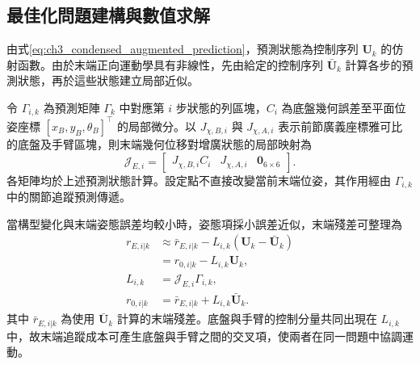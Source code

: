 \subsection{最佳化問題建構與數值求解}
\label{subsec:wholebody_qp_formulation}

由式\eqref{eq:ch3_condensed_augmented_prediction}，預測狀態為控制序列 $\mathbf{U}_k$ 的仿射函數。由於末端正向運動學具有非線性，先由給定的控制序列 $\bar{\mathbf{U}}_k$ 計算各步的預測狀態，再於這些狀態建立局部近似。

令 $\Gamma_{i,k}$ 為預測矩陣 $\Gamma_k$ 中對應第 $i$ 步狀態的列區塊，$C_i$ 為底盤幾何誤差至平面位姿座標 $[x_B,y_B,\theta_B]^{\top}$ 的局部微分。以 $J_{\chi,B,i}$ 與 $J_{\chi,A,i}$ 表示前節廣義座標雅可比的底盤及手臂區塊，則末端幾何位移對增廣狀態的局部映射為
\begin{equation}
    \mathcal{J}_{E,i}=
    \begin{bmatrix}
        J_{\chi,B,i}C_i & J_{\chi,A,i} & \mathbf{0}_{6\times6}
    \end{bmatrix}.
    \label{eq:ch3_tcp_augmented_geometric_jacobian}
\end{equation}
各矩陣均於上述預測狀態計算。設定點不直接改變當前末端位姿，其作用經由 $\Gamma_{i,k}$ 中的關節追蹤預測傳遞。

當構型變化與末端姿態誤差均較小時，姿態項採小誤差近似，末端殘差可整理為
\begin{equation}
    \begin{aligned}
        r_{E,i|k}
        &\approx\bar{r}_{E,i|k}
          -L_{i,k}(\mathbf{U}_k-\bar{\mathbf{U}}_k) \\
        &=r_{0,i|k}-L_{i,k}\mathbf{U}_k, \\
        L_{i,k}
        &=\mathcal{J}_{E,i}\Gamma_{i,k}, \\
        r_{0,i|k}
        &=\bar{r}_{E,i|k}+L_{i,k}\bar{\mathbf{U}}_k.
    \end{aligned}
    \label{eq:ch3_tcp_affine_residual}
\end{equation}
其中 $\bar{r}_{E,i|k}$ 為使用 $\bar{\mathbf{U}}_k$ 計算的末端殘差。底盤與手臂的控制分量共同出現在 $L_{i,k}$ 中，故末端追蹤成本可產生底盤與手臂之間的交叉項，使兩者在同一問題中協調運動。

